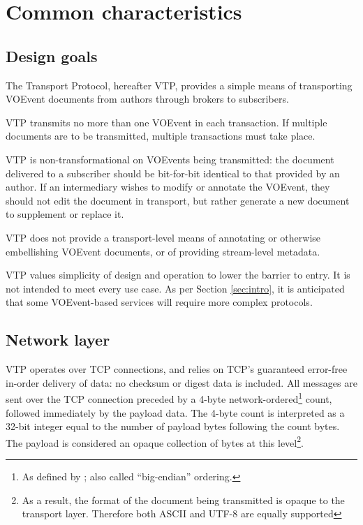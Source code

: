 \documentclass[a4paper,11pt]{ivoa}
\begin{document}
\section{Common characteristics}

\subsection{Design goals}
\label{sec:common:design}

The Transport Protocol, hereafter VTP, provides a simple means of transporting
VOEvent documents from authors through brokers to subscribers.

VTP transmits no more than one VOEvent in each transaction. If multiple
documents are to be transmitted, multiple transactions must take place.

VTP is non-transformational on VOEvents being transmitted: the document
delivered to a subscriber should be bit-for-bit identical to that provided by
an author. If an intermediary wishes to modify or annotate the VOEvent, they
should not edit the document in transport, but rather generate a new document
to supplement or replace it.

VTP does not provide a transport-level means of annotating or otherwise
embellishing VOEvent documents, or of providing stream-level metadata.

VTP values simplicity of design and operation to lower the barrier to entry. It
is not intended to meet every use case. As per Section \ref{sec:intro}, it is
anticipated that some VOEvent-based services will require more complex
protocols.

\subsection{Network layer}

VTP operates over TCP \citep{Cerf:1974} connections, and relies on TCP's
guaranteed error-free in-order delivery of data: no checksum or digest data is
included. All messages are sent over the TCP connection preceded by a 4-byte
network-ordered\footnote{As defined by \citet{Reynolds:1994}; also called
``big-endian'' ordering.} count, followed immediately by the payload data. The
4-byte count is interpreted as a 32-bit integer equal to the number of payload
bytes following the count bytes. The payload is considered an opaque
collection of bytes at this level\footnote{As a result, the format of the
document being transmitted is opaque to the transport layer. Therefore both
ASCII and UTF-8 are equally supported}.
\end{document}
